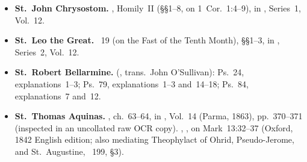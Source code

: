 \begin{itemize}[leftmargin=1.5em,itemsep=0.35em]
\item \textbf{St.~John Chrysostom.} , Homily~II (§§1--8, on 1~Cor.~1:4--9), in , Series~1, Vol.~12.

\item \textbf{St.~Leo the Great.} ~19 (on the Fast of the Tenth Month), §§1--3, in , Series~2, Vol.~12.

\item \textbf{St.~Robert Bellarmine.}  (, trans.\ John O'Sullivan): Ps.~24, explanations~1--3; Ps.~79, explanations~1--3 and~14--18; Ps.~84, explanations~7 and~12.

\item \textbf{St.~Thomas Aquinas.} , ch.~63--64, in , Vol.~14 (Parma, 1863), pp.~370--371 (inspected in an uncollated raw OCR copy). , , on Mark~13:32--37 (Oxford, 1842 English edition; also mediating Theophylact of Ohrid, Pseudo-Jerome, and St.~Augustine, ~199, §3).

\end{itemize}
